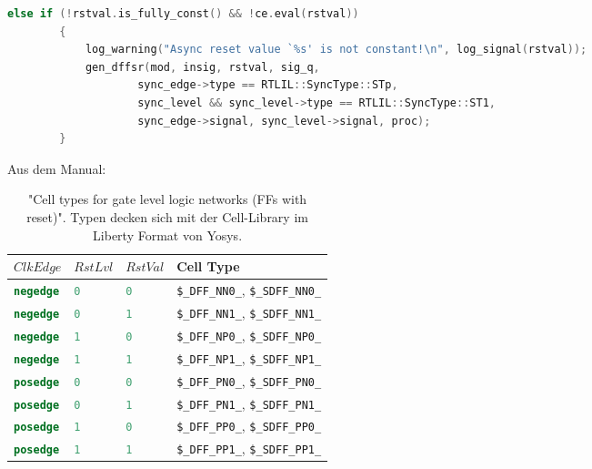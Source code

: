 \documentclass[11pt]{report}
\begin{document}
\begin{enumerate}
\begin{lstlisting}[language=C++]
else if (!rstval.is_fully_const() && !ce.eval(rstval))
		{
			log_warning("Async reset value `%s' is not constant!\n", log_signal(rstval));
			gen_dffsr(mod, insig, rstval, sig_q,
					sync_edge->type == RTLIL::SyncType::STp,
					sync_level && sync_level->type == RTLIL::SyncType::ST1,
					sync_edge->signal, sync_level->signal, proc);
		}
\end{lstlisting}
Aus dem Manual:
\begin{table}[h]
\hfil
\begin{tabular}[h]{llll}
$ClkEdge$ & $RstLvl$ & $RstVal$ & Cell Type \\
\hline
\lstinline[language=Verilog];negedge; & \lstinline[language=Verilog];0; & \lstinline[language=Verilog];0; & {\tt \$\_DFF\_NN0\_}, {\tt \$\_SDFF\_NN0\_} \\
\lstinline[language=Verilog];negedge; & \lstinline[language=Verilog];0; & \lstinline[language=Verilog];1; & {\tt \$\_DFF\_NN1\_}, {\tt \$\_SDFF\_NN1\_} \\
\lstinline[language=Verilog];negedge; & \lstinline[language=Verilog];1; & \lstinline[language=Verilog];0; & {\tt \$\_DFF\_NP0\_}, {\tt \$\_SDFF\_NP0\_} \\
\lstinline[language=Verilog];negedge; & \lstinline[language=Verilog];1; & \lstinline[language=Verilog];1; & {\tt \$\_DFF\_NP1\_}, {\tt \$\_SDFF\_NP1\_} \\
\lstinline[language=Verilog];posedge; & \lstinline[language=Verilog];0; & \lstinline[language=Verilog];0; & {\tt \$\_DFF\_PN0\_}, {\tt \$\_SDFF\_PN0\_} \\
\lstinline[language=Verilog];posedge; & \lstinline[language=Verilog];0; & \lstinline[language=Verilog];1; & {\tt \$\_DFF\_PN1\_}, {\tt \$\_SDFF\_PN1\_} \\
\lstinline[language=Verilog];posedge; & \lstinline[language=Verilog];1; & \lstinline[language=Verilog];0; & {\tt \$\_DFF\_PP0\_}, {\tt \$\_SDFF\_PP0\_} \\
\lstinline[language=Verilog];posedge; & \lstinline[language=Verilog];1; & \lstinline[language=Verilog];1; & {\tt \$\_DFF\_PP1\_}, {\tt \$\_SDFF\_PP1\_} \\
\end{tabular}
\caption{"Cell types for gate level logic networks (FFs with reset)". Typen decken sich mit der Cell-Library im Liberty Format von Yosys.}
\label{tab:CellLib_gates_adff}
\end{table}

\end{enumerate}
\end{document}
